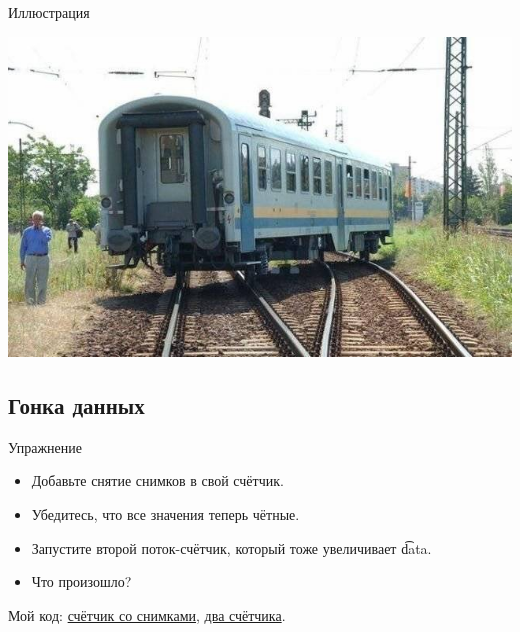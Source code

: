 \begin{frame}{Иллюстрация}
	\begin{center}
		\includegraphics[scale=0.6]{race-condition.jpg}
	\end{center}
\end{frame}

\subsection{Гонка данных}
\begin{frame}{Упражнение}
	\begin{itemize}
		\item Добавьте снятие снимков в свой счётчик.
		\item Убедитесь, что все значения теперь чётные.
		\item Запустите второй поток-счётчик, который тоже увеличивает \t{data}.
		\item Что произошло?
	\end{itemize}
	Мой код:
	\href{https://github.com/yeputons/fall-2016-paradigms/raw/master/161019/sources/07-even-counter-snapshot.c}{счётчик со снимками},
	\href{https://github.com/yeputons/fall-2016-paradigms/raw/master/161019/sources/08-two-threads.c}{два счётчика}.
\end{frame}

